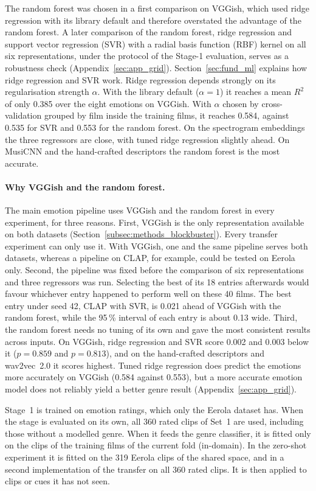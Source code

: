The random forest was chosen in a first comparison on VGGish, which used ridge regression with its library default and therefore overstated the advantage of the random forest. A later comparison of the random forest, ridge regression and support vector regression (SVR) with a radial basis function (RBF) kernel on all six representations, under the protocol of the Stage-1 evaluation, serves as a robustness check (Appendix~\ref{sec:app_grid}). Section~\ref{sec:fund_ml} explains how ridge regression and SVR work. Ridge regression depends strongly on its regularisation strength $\alpha$. With the library default ($\alpha=1$) it reaches a mean $R^2$ of only 0.385 over the eight emotions on VGGish. With $\alpha$ chosen by cross-validation grouped by film inside the training films, it reaches 0.584, against 0.535 for SVR and 0.553 for the random forest.  On the spectrogram embeddings the three regressors are close, with tuned ridge regression slightly ahead. On MusiCNN and the hand-crafted descriptors the random forest is the most accurate. 

\paragraph{Why VGGish and the random forest.} The main emotion pipeline uses VGGish and the random forest in every experiment, for three reasons. First, VGGish is the only representation available on both datasets (Section~\ref{subsec:methods_blockbuster}). Every transfer experiment can only use it. With VGGish, one and the same pipeline serves both datasets, whereas a pipeline on CLAP, for example, could be tested on Eerola only. Second, the pipeline was fixed before the comparison of six representations and three regressors was run. Selecting the best of its 18 entries afterwards would favour whichever entry happened to perform well on these 40 films. The best entry under seed 42, CLAP with SVR, is 0.021 ahead of VGGish with the random forest, while the 95\,\% interval of each entry is about 0.13 wide. Third, the random forest needs no tuning of its own and gave the most consistent results across inputs. On VGGish, ridge regression and SVR score 0.002 and 0.003 below it ($p=0.859$ and $p=0.813$), and on the hand-crafted descriptors and wav2vec~2.0 it scores highest. Tuned ridge regression does predict the emotions more accurately on VGGish (0.584 against 0.553), but a more accurate emotion model does not reliably yield a better genre result (Appendix~\ref{sec:app_grid}).

Stage~1 is trained on emotion ratings, which only the Eerola dataset has. When the stage is evaluated on its own, all 360 rated clips of Set~1 are used, including those without a modelled genre. When it feeds the genre classifier, it is fitted only on the clips of the training films of the current fold (in-domain). In the zero-shot experiment it is fitted on the 319 Eerola clips of the shared space, and in a second implementation of the transfer on all 360 rated clips. It is then applied to clips or cues it has not seen.

